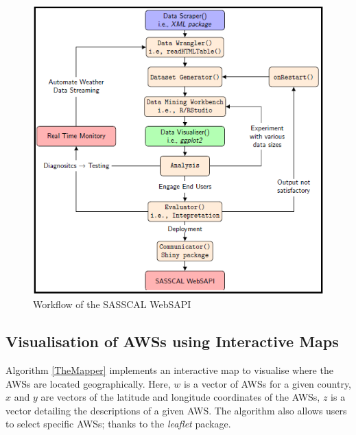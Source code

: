 \documentclass[a4paper, 10pt, conference]{ieeeconf}      %
\begin{document}
\begin{figure}[h]
		\centering
		\includegraphics[width=1\linewidth]{fig/MiPipeLine}
		\caption{Workflow of the  SASSCAL WebSAPI}
		\label{Flw}
	\end{figure}
\noindent
\subsection{\textbf{Visualisation of AWSs using Interactive Maps}}
\noindent
Algorithm \ref{TheMapper}  implements an interactive map  to visualise  where the AWSs are located geographically. Here,  $w$ is a vector of AWSs for a given country, $x$ and $y$ are vectors of the latitude and longitude coordinates of the AWSs, $z$ is a vector detailing  the descriptions of a given AWS. The algorithm also allows  users to select specific AWSs; thanks to the \emph{leaflet}   package.
\end{document}
